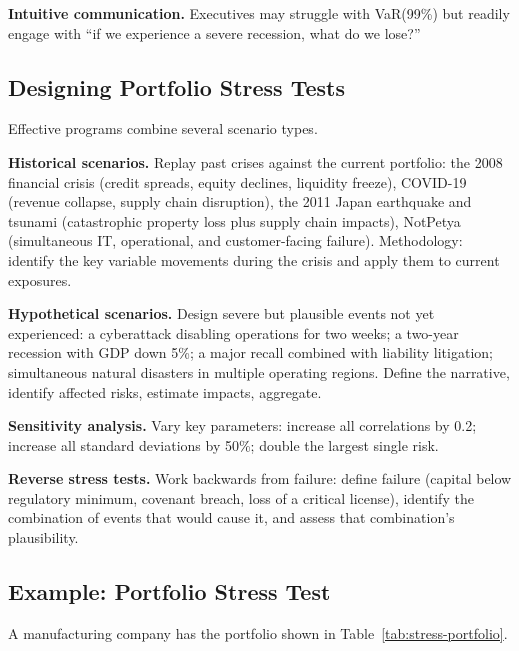 \documentclass[11pt,openany]{book}
\begin{document}
\textbf{Intuitive communication.} Executives may struggle with VaR(99\%) but
readily engage with ``if we experience a severe recession, what do we lose?''

\subsection{Designing Portfolio Stress Tests}
\label{subsec:designing-stress-tests}

Effective programs combine several scenario types.

\textbf{Historical scenarios.} Replay past crises against the current
portfolio: the 2008 financial crisis (credit spreads, equity declines,
liquidity freeze), COVID-19 (revenue collapse, supply chain disruption), the
2011 Japan earthquake and tsunami (catastrophic property loss plus supply
chain impacts), NotPetya (simultaneous IT, operational, and customer-facing
failure). Methodology: identify the key variable movements during the crisis
and apply them to current exposures.

\textbf{Hypothetical scenarios.} Design severe but plausible events not yet
experienced: a cyberattack disabling operations for two weeks; a two-year
recession with GDP down 5\%; a major recall combined with liability
litigation; simultaneous natural disasters in multiple operating regions.
Define the narrative, identify affected risks, estimate impacts, aggregate.

\textbf{Sensitivity analysis.} Vary key parameters: increase all correlations
by 0.2; increase all standard deviations by 50\%; double the largest single
risk.

\textbf{Reverse stress tests.} Work backwards from failure: define failure
(capital below regulatory minimum, covenant breach, loss of a critical
license), identify the combination of events that would cause it, and assess
that combination's plausibility.

\subsection{Example: Portfolio Stress Test}
\label{subsec:stress-test-example}

A manufacturing company has the portfolio shown in
Table~\ref{tab:stress-portfolio}.
\end{document}
